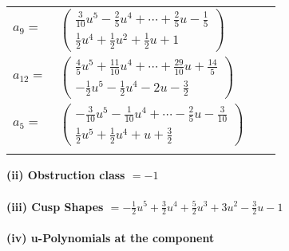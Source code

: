 \documentclass[1p]{elsarticle_modified}
\theoremstyle{definition}
\begin{document}
\begin{tabular}{m{7pt} m{180pt} m{7pt} m{180pt} }
\flushright $a_{9}=$&$\begin{pmatrix}\frac{3}{10} u^5-\frac{2}{5} u^4+\cdots+\frac{2}{5} u-\frac{1}{5}\\\frac{1}{2} u^4+\frac{1}{2} u^2+\frac{1}{2} u+1\end{pmatrix}$ \\
\flushright $a_{12}=$&$\begin{pmatrix}\frac{4}{5} u^5+\frac{11}{10} u^4+\cdots+\frac{29}{10} u+\frac{14}{5}\\-\frac{1}{2} u^5-\frac{1}{2} u^4-2 u-\frac{3}{2}\end{pmatrix}$ \\
\flushright $a_{5}=$&$\begin{pmatrix}-\frac{3}{10} u^5-\frac{1}{10} u^4+\cdots-\frac{2}{5} u-\frac{3}{10}\\\frac{1}{2} u^5+\frac{1}{2} u^4+u+\frac{3}{2}\end{pmatrix}$\\&\end{tabular}
\flushleft \textbf{(ii) Obstruction class $= -1$}\\~\\
\flushleft \textbf{(iii) Cusp Shapes $= -\frac{1}{2} u^5+\frac{3}{2} u^4+\frac{5}{2} u^3+3 u^2-\frac{3}{2} u-1$}\\~\\
\newpage\renewcommand{\arraystretch}{1}
\flushleft \textbf{(iv) u-Polynomials at the component}\newline \\
\end{document}
